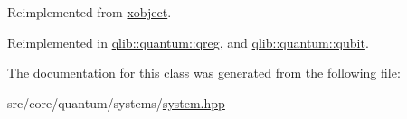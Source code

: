 Reimplemented from \hyperlink{classxobject_ad76243a44c4e4959d3b16bb57d82600d}{xobject}.



Reimplemented in \hyperlink{classqlib_1_1quantum_1_1qreg_ae4dbf316bf6452f3110cb05146f54954}{qlib\+::quantum\+::qreg}, and \hyperlink{classqlib_1_1quantum_1_1qubit_a8bf29d1f66508e4878ea861c5d8e44ec}{qlib\+::quantum\+::qubit}.



The documentation for this class was generated from the following file\+:\begin{DoxyCompactItemize}
\item 
src/core/quantum/systems/\hyperlink{system_8hpp}{system.\+hpp}\end{DoxyCompactItemize}
